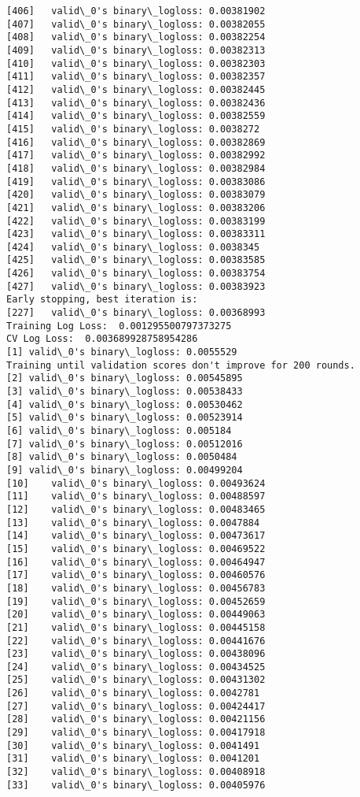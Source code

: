 \documentclass[11pt]{article}
\begin{document}
\begin{Verbatim}[commandchars=\\\{\}]
[406]	valid\_0's binary\_logloss: 0.00381902
[407]	valid\_0's binary\_logloss: 0.00382055
[408]	valid\_0's binary\_logloss: 0.00382254
[409]	valid\_0's binary\_logloss: 0.00382313
[410]	valid\_0's binary\_logloss: 0.00382303
[411]	valid\_0's binary\_logloss: 0.00382357
[412]	valid\_0's binary\_logloss: 0.00382445
[413]	valid\_0's binary\_logloss: 0.00382436
[414]	valid\_0's binary\_logloss: 0.00382559
[415]	valid\_0's binary\_logloss: 0.0038272
[416]	valid\_0's binary\_logloss: 0.00382869
[417]	valid\_0's binary\_logloss: 0.00382992
[418]	valid\_0's binary\_logloss: 0.00382984
[419]	valid\_0's binary\_logloss: 0.00383086
[420]	valid\_0's binary\_logloss: 0.00383079
[421]	valid\_0's binary\_logloss: 0.00383206
[422]	valid\_0's binary\_logloss: 0.00383199
[423]	valid\_0's binary\_logloss: 0.00383311
[424]	valid\_0's binary\_logloss: 0.0038345
[425]	valid\_0's binary\_logloss: 0.00383585
[426]	valid\_0's binary\_logloss: 0.00383754
[427]	valid\_0's binary\_logloss: 0.00383923
Early stopping, best iteration is:
[227]	valid\_0's binary\_logloss: 0.00368993
Training Log Loss:  0.001295500797373275
CV Log Loss:  0.003689928758954286
[1]	valid\_0's binary\_logloss: 0.0055529
Training until validation scores don't improve for 200 rounds.
[2]	valid\_0's binary\_logloss: 0.00545895
[3]	valid\_0's binary\_logloss: 0.00538433
[4]	valid\_0's binary\_logloss: 0.00530462
[5]	valid\_0's binary\_logloss: 0.00523914
[6]	valid\_0's binary\_logloss: 0.005184
[7]	valid\_0's binary\_logloss: 0.00512016
[8]	valid\_0's binary\_logloss: 0.0050484
[9]	valid\_0's binary\_logloss: 0.00499204
[10]	valid\_0's binary\_logloss: 0.00493624
[11]	valid\_0's binary\_logloss: 0.00488597
[12]	valid\_0's binary\_logloss: 0.00483465
[13]	valid\_0's binary\_logloss: 0.0047884
[14]	valid\_0's binary\_logloss: 0.00473617
[15]	valid\_0's binary\_logloss: 0.00469522
[16]	valid\_0's binary\_logloss: 0.00464947
[17]	valid\_0's binary\_logloss: 0.00460576
[18]	valid\_0's binary\_logloss: 0.00456783
[19]	valid\_0's binary\_logloss: 0.00452659
[20]	valid\_0's binary\_logloss: 0.00449063
[21]	valid\_0's binary\_logloss: 0.00445158
[22]	valid\_0's binary\_logloss: 0.00441676
[23]	valid\_0's binary\_logloss: 0.00438096
[24]	valid\_0's binary\_logloss: 0.00434525
[25]	valid\_0's binary\_logloss: 0.00431302
[26]	valid\_0's binary\_logloss: 0.0042781
[27]	valid\_0's binary\_logloss: 0.00424417
[28]	valid\_0's binary\_logloss: 0.00421156
[29]	valid\_0's binary\_logloss: 0.00417918
[30]	valid\_0's binary\_logloss: 0.0041491
[31]	valid\_0's binary\_logloss: 0.0041201
[32]	valid\_0's binary\_logloss: 0.00408918
[33]	valid\_0's binary\_logloss: 0.00405976

\end{Verbatim}
\end{document}
